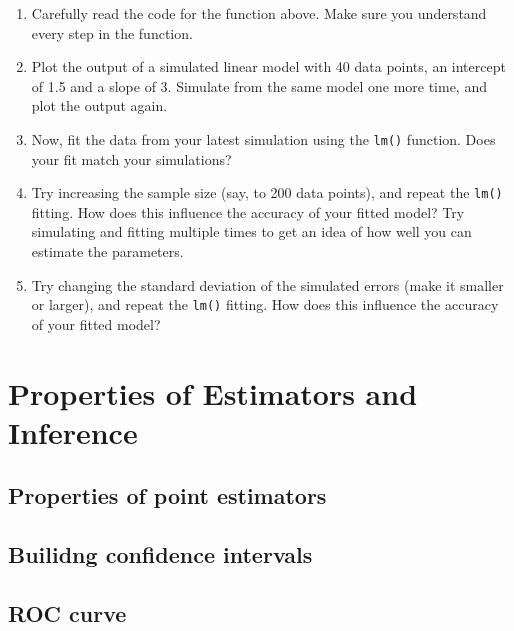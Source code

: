 \documentclass[
]{book}
\providecommand{\tightlist}{%
  \setlength{\itemsep}{0pt}\setlength{\parskip}{0pt}}
\begin{document}
\begin{enumerate}
\def\labelenumi{\alph{enumi})}
\tightlist
\item
  Carefully read the code for the function above. Make sure you understand every step in the function.\\
\item
  Plot the output of a simulated linear model with 40 data points, an intercept of 1.5 and a slope of 3. Simulate from the same model one more time, and plot the output again.\\
\item
  Now, fit the data from your latest simulation using the \texttt{lm()} function. Does your fit match your simulations?\\
\item
  Try increasing the sample size (say, to 200 data points), and repeat the \texttt{lm()} fitting. How does this influence the accuracy of your fitted model? Try simulating and fitting multiple times to get an idea of how well you can estimate the parameters.\\
\item
  Try changing the standard deviation of the simulated errors (make it smaller or larger), and repeat the \texttt{lm()} fitting. How does this influence the accuracy of your fitted model?
\end{enumerate}

\hypertarget{properties-of-estimators-and-inference}{%
\chapter{Properties of Estimators and Inference}\label{properties-of-estimators-and-inference}}

\hypertarget{properties-of-point-estimators}{%
\section{Properties of point estimators}\label{properties-of-point-estimators}}

\hypertarget{builidng-confidence-intervals}{%
\section{Builidng confidence intervals}\label{builidng-confidence-intervals}}

\hypertarget{roc-curve}{%
\section{ROC curve}\label{roc-curve}}
\end{document}
